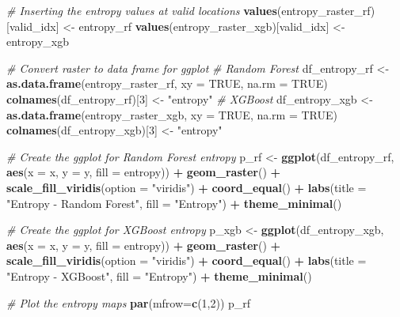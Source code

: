 \documentclass[
]{article}
\newenvironment{Shaded}{\begin{snugshade}}{\end{snugshade}}
\newcommand{\AttributeTok}[1]{\textcolor[rgb]{0.13,0.29,0.53}{#1}}
\newcommand{\CommentTok}[1]{\textcolor[rgb]{0.56,0.35,0.01}{\textit{#1}}}
\newcommand{\ConstantTok}[1]{\textcolor[rgb]{0.56,0.35,0.01}{#1}}
\newcommand{\DecValTok}[1]{\textcolor[rgb]{0.00,0.00,0.81}{#1}}
\newcommand{\FunctionTok}[1]{\textcolor[rgb]{0.13,0.29,0.53}{\textbf{#1}}}
\newcommand{\NormalTok}[1]{#1}
\newcommand{\OtherTok}[1]{\textcolor[rgb]{0.56,0.35,0.01}{#1}}
\newcommand{\SpecialCharTok}[1]{\textcolor[rgb]{0.81,0.36,0.00}{\textbf{#1}}}
\newcommand{\StringTok}[1]{\textcolor[rgb]{0.31,0.60,0.02}{#1}}
\begin{document}
\begin{Shaded}
\begin{Highlighting}[]
\CommentTok{\# Inserting the entropy values at valid locations}
\FunctionTok{values}\NormalTok{(entropy\_raster\_rf)[valid\_idx] }\OtherTok{\textless{}{-}}\NormalTok{ entropy\_rf}
\FunctionTok{values}\NormalTok{(entropy\_raster\_xgb)[valid\_idx] }\OtherTok{\textless{}{-}}\NormalTok{ entropy\_xgb}

\CommentTok{\# Convert raster to data frame for ggplot}
\CommentTok{\# Random Forest}
\NormalTok{df\_entropy\_rf }\OtherTok{\textless{}{-}} \FunctionTok{as.data.frame}\NormalTok{(entropy\_raster\_rf, }
                               \AttributeTok{xy =} \ConstantTok{TRUE}\NormalTok{, }\AttributeTok{na.rm =} \ConstantTok{TRUE}\NormalTok{)}
\FunctionTok{colnames}\NormalTok{(df\_entropy\_rf)[}\DecValTok{3}\NormalTok{] }\OtherTok{\textless{}{-}} \StringTok{"entropy"}
\CommentTok{\# XGBoost}
\NormalTok{df\_entropy\_xgb }\OtherTok{\textless{}{-}} \FunctionTok{as.data.frame}\NormalTok{(entropy\_raster\_xgb, }
                                \AttributeTok{xy =} \ConstantTok{TRUE}\NormalTok{, }\AttributeTok{na.rm =} \ConstantTok{TRUE}\NormalTok{)}
\FunctionTok{colnames}\NormalTok{(df\_entropy\_xgb)[}\DecValTok{3}\NormalTok{] }\OtherTok{\textless{}{-}} \StringTok{"entropy"}

\CommentTok{\# Create the ggplot for Random Forest entropy}
\NormalTok{p\_rf }\OtherTok{\textless{}{-}} \FunctionTok{ggplot}\NormalTok{(df\_entropy\_rf, }\FunctionTok{aes}\NormalTok{(}\AttributeTok{x =}\NormalTok{ x, }\AttributeTok{y =}\NormalTok{ y, }\AttributeTok{fill =}\NormalTok{ entropy)) }\SpecialCharTok{+}
  \FunctionTok{geom\_raster}\NormalTok{() }\SpecialCharTok{+}
  \FunctionTok{scale\_fill\_viridis}\NormalTok{(}\AttributeTok{option =} \StringTok{"viridis"}\NormalTok{) }\SpecialCharTok{+}
  \FunctionTok{coord\_equal}\NormalTok{() }\SpecialCharTok{+}
  \FunctionTok{labs}\NormalTok{(}\AttributeTok{title =} \StringTok{"Entropy {-} Random Forest"}\NormalTok{, }\AttributeTok{fill =} \StringTok{"Entropy"}\NormalTok{) }\SpecialCharTok{+}
  \FunctionTok{theme\_minimal}\NormalTok{()}

\CommentTok{\# Create the ggplot for XGBoost entropy}
\NormalTok{p\_xgb }\OtherTok{\textless{}{-}} \FunctionTok{ggplot}\NormalTok{(df\_entropy\_xgb, }\FunctionTok{aes}\NormalTok{(}\AttributeTok{x =}\NormalTok{ x, }\AttributeTok{y =}\NormalTok{ y, }\AttributeTok{fill =}\NormalTok{ entropy)) }\SpecialCharTok{+}
  \FunctionTok{geom\_raster}\NormalTok{() }\SpecialCharTok{+}
  \FunctionTok{scale\_fill\_viridis}\NormalTok{(}\AttributeTok{option =} \StringTok{"viridis"}\NormalTok{) }\SpecialCharTok{+}
  \FunctionTok{coord\_equal}\NormalTok{() }\SpecialCharTok{+}
  \FunctionTok{labs}\NormalTok{(}\AttributeTok{title =} \StringTok{"Entropy {-} XGBoost"}\NormalTok{, }\AttributeTok{fill =} \StringTok{"Entropy"}\NormalTok{) }\SpecialCharTok{+}
  \FunctionTok{theme\_minimal}\NormalTok{()         }

\CommentTok{\# Plot the entropy maps}
\FunctionTok{par}\NormalTok{(}\AttributeTok{mfrow=}\FunctionTok{c}\NormalTok{(}\DecValTok{1}\NormalTok{,}\DecValTok{2}\NormalTok{))}
\NormalTok{p\_rf}
\end{Highlighting}
\end{Shaded}
\end{document}
